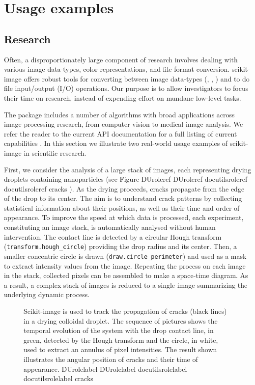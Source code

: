 \documentclass[fleqn,12pt]{wlpeerj}
\providecommand*{\DUrole}[2]{%
  \ifcsname DUrole#1\endcsname%
    \csname DUrole#1\endcsname{#2}%
  \else%
    \ifcsname docutilsrole#1\endcsname%
      \csname docutilsrole#1\endcsname{#2}%
    \else%
      #2%
    \fi%
  \fi%
}
\begin{document}
\section*{Usage examples}
  \label{usage-examples}

\subsection*{Research}
  \label{research}

Often, a disproportionately large component of research involves dealing with
various image data-types, color representations, and file format
conversion. scikit-image offers robust tools for converting between image
data-types (\cite{DirectX}, \cite{OpenGL}, \cite{GraphicsGemsI}) and to do file input/output
(I/O) operations.  Our purpose is to allow investigators to focus their time on
research, instead of expending effort on mundane low-level tasks.

The package includes a number of algorithms with broad applications across
image processing research, from computer vision to medical image analysis. We
refer the reader to the current API documentation for a full listing of current
capabilities \cite{APIdocs}. In this section we illustrate two real-world usage
examples of scikit-image in scientific research.

First, we consider the analysis of a large stack of images, each representing
drying droplets containing nanoparticles (see Figure \DUrole{ref}{cracks}). As the drying proceeds,
cracks propagate from the edge of the drop to its center. The aim is to understand
crack patterns by collecting statistical information about their positions,
as well as their time and order of appearance. To improve the speed at which
data is processed,
each experiment, constituting an image stack, is automatically analysed without
human intervention. The contact line is detected by a circular Hough transform
(\texttt{transform.hough\_circle}) providing the drop radius and its center. Then, a
smaller concentric circle is drawn (\texttt{draw.circle\_perimeter}) and used as
a mask to extract intensity values from the image.
Repeating the process on each image in the stack, collected
pixels can be assembled to make a space-time diagram. As a result, a complex
stack of images is reduced to a single image summarizing the underlying dynamic
process.\begin{figure}[bht]\noindent{}
\caption{Scikit-image is used to track the propagation of cracks (black lines)
in a drying colloidal droplet. The sequence of pictures shows the temporal
evolution of the system with the drop contact line, in green, detected by the
Hough transform and the circle, in white, used to extract an annulus of
pixel intensities.  The result shown illustrates the angular position of
cracks and their time of appearance. \DUrole{label}{cracks}}
\end{figure}
\end{document}
